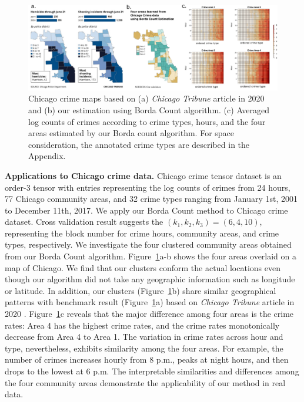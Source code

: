 \documentclass{article}
\theoremstyle{definition}
\begin{document}
\begin{figure}[h]
    \centering
    \includegraphics[width =1 \textwidth]{figures/drawing2.pdf}
    \caption{Chicago crime maps based on (a) \textit{Chicago Tribune} article in 2020 \citep{Jeremy.2020} and (b) our estimation using Borda Count algorithm. (c) Averaged log counts of crimes according to crime types, hours, and the four areas estimated by our Borda count algorithm. For space consideration, the annotated crime types are described in the Appendix.}
    \label{fig:area}
    \vspace{-.6cm}
\end{figure}

{\bf Applications to Chicago crime data.} Chicago crime tensor dataset is an order-3 tensor with entries representing the log counts of crimes from 24 hours, 77 Chicago community areas, and 32 crime types ranging from January 1st, 2001 to December 11th, 2017. We apply our Borda Count method to Chicago crime dataset. Cross validation result suggests the $(k_1,k_2,k_3)=(6,4,10)$, representing the block number for crime hours, community areas, and crime types, respectively.
We investigate the four clustered community areas obtained from our Borda Count algorithm. Figure~\ref{fig:area}a-b shows the four areas overlaid on a map of Chicago. We find that our clusters conform the actual locations even though our algorithm did not take any geographic information such as longitude or latitude. In addition, our clusters (Figure~\ref{fig:area}b) share similar geographical patterns with benchmark result (Figure~\ref{fig:area}a) based on \textit{Chicago Tribune} article in 2020 \citep{Jeremy.2020}. 
Figure~\ref{fig:area}c reveals that the major difference among four areas is the crime rates: Area 4 has the highest crime rates, and the crime rates monotonically decrease from Area 4 to Area 1. The variation in crime rates across hour and type, nevertheless, exhibits similarity among the four areas. For example, the number of crimes increases hourly from 8 p.m., peaks at night hours, and then drops to the lowest at 6 p.m. The interpretable similarities and differences among the four community areas demonstrate the applicability of our method in real data.
\end{document}
